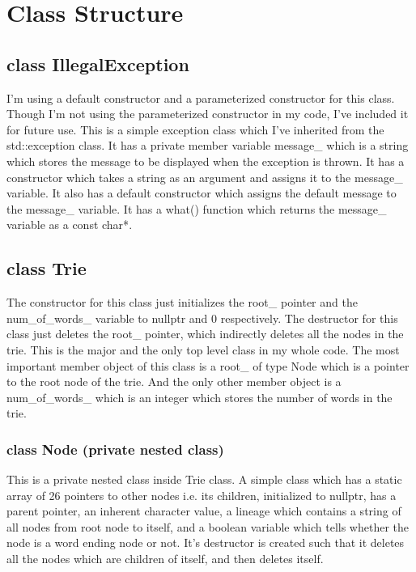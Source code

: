 \documentclass[a4paper]{article}
\begin{document}
\section{Class Structure}

\subsection{{\color{orange}class} {\Large{\color{draculapurple}IllegalException}}}
I'm using a default constructor and a parameterized constructor for this class. Though I'm not using the parameterized constructor in my code, I've included it for future use.
This is a simple exception class which I've inherited from the {\color{draculapurple}std::exception} class. 
It has a private member variable {\color{Turquoise}message\_} which is a string which stores the message to be 
displayed when the exception is thrown. It has a constructor which takes a string as an argument and assigns it 
to the {\color{Turquoise}message\_} variable. It also has a default constructor which assigns the default 
message to the {\color{Turquoise}message\_} variable. It has a {\color{draculapurple}what()} function which returns 
the {\color{Turquoise}message\_} variable as a {\color{draculapurple}const char*}.

\subsection{{\color{orange}class} {\Large{\color{draculapurple}Trie}}}
The {\color{draculapurple}constructor} for this class just initializes the {\color{draculapurple}root\_} pointer and the {\color{draculapurple}num\_of\_words\_} variable to 
{\color{draculapurple}nullptr} and {\color{draculapurple}0} respectively. The {\color{draculapurple}destructor} for this class just deletes the {\color{draculapurple}root\_} pointer, which indirectly deletes all the nodes in the trie.
This is the major and the only top level class in my whole code. The most important member object of this class is a {\color{draculapurple}root\_} of 
type {\color{draculapurple}Node} which is a pointer to the root node of the trie. And the only other member object is a {\color{draculapurple}num\_of\_words\_} 
which is an integer which stores the number of words in the trie.

\subsubsection{{\color{orange}class} {\color{draculapurple}Node} (private nested class)}
This is a private nested class inside {\color{draculapurple}Trie} class. A simple class which has a static array of 26 pointers to other nodes i.e. its {\color{Turquoise}children}, initialized to nullptr, has a {\color{Turquoise}parent} pointer, 
an inherent {\color{Turquoise}character value}, a {\color{Turquoise}lineage} which contains a string of all nodes from root node to itself, and a boolean variable which 
tells whether the node is a {\color{Turquoise}word ending} node or not.
It's {\color{draculapurple}destructor} is created such that it deletes all the nodes which are children of itself, and then deletes itself.
\end{document}

